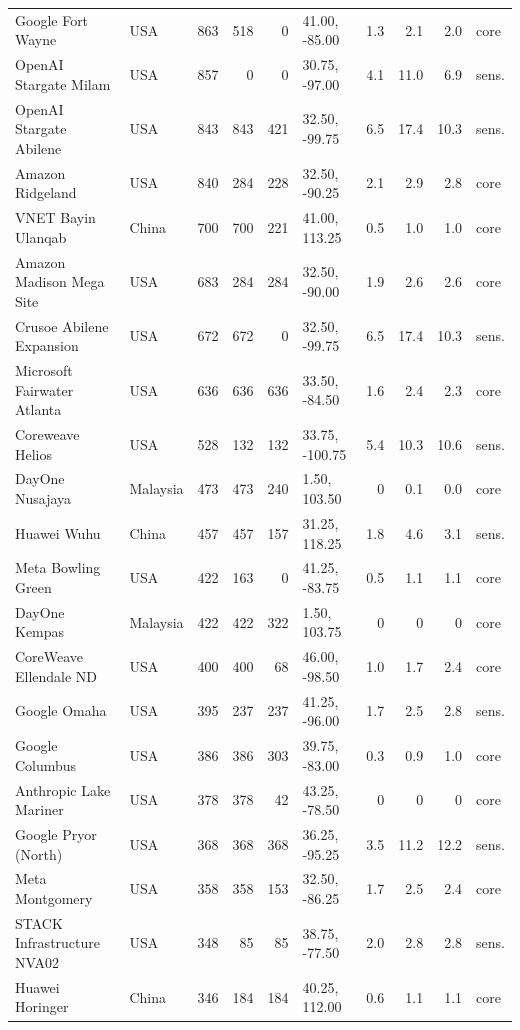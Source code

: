 \begin{footnotesize}
\begin{longtable}{@{}p{46mm}lrrrlrrrl@{}}
Google Fort Wayne & USA & 863 & 518 & 0 & 41.00, -85.00 & 1.3 & 2.1 & 2.0 & core \\
OpenAI Stargate Milam & USA & 857 & 0 & 0 & 30.75, -97.00 & 4.1 & 11.0 & 6.9 & sens. \\
OpenAI Stargate Abilene & USA & 843 & 843 & 421 & 32.50, -99.75 & 6.5 & 17.4 & 10.3 & sens. \\
Amazon Ridgeland & USA & 840 & 284 & 228 & 32.50, -90.25 & 2.1 & 2.9 & 2.8 & core \\
VNET Bayin Ulanqab & China & 700 & 700 & 221 & 41.00, 113.25 & 0.5 & 1.0 & 1.0 & core \\
Amazon Madison Mega Site & USA & 683 & 284 & 284 & 32.50, -90.00 & 1.9 & 2.6 & 2.6 & core \\
Crusoe Abilene Expansion & USA & 672 & 672 & 0 & 32.50, -99.75 & 6.5 & 17.4 & 10.3 & sens. \\
Microsoft Fairwater Atlanta & USA & 636 & 636 & 636 & 33.50, -84.50 & 1.6 & 2.4 & 2.3 & core \\
Coreweave Helios & USA & 528 & 132 & 132 & 33.75, -100.75 & 5.4 & 10.3 & 10.6 & sens. \\
DayOne Nusajaya & Malaysia & 473 & 473 & 240 & 1.50, 103.50 & 0 & 0.1 & 0.0 & core \\
Huawei Wuhu & China & 457 & 457 & 157 & 31.25, 118.25 & 1.8 & 4.6 & 3.1 & sens. \\
Meta Bowling Green & USA & 422 & 163 & 0 & 41.25, -83.75 & 0.5 & 1.1 & 1.1 & core \\
DayOne Kempas & Malaysia & 422 & 422 & 322 & 1.50, 103.75 & 0 & 0 & 0 & core \\
CoreWeave Ellendale ND & USA & 400 & 400 & 68 & 46.00, -98.50 & 1.0 & 1.7 & 2.4 & core \\
Google Omaha & USA & 395 & 237 & 237 & 41.25, -96.00 & 1.7 & 2.5 & 2.8 & sens. \\
Google Columbus & USA & 386 & 386 & 303 & 39.75, -83.00 & 0.3 & 0.9 & 1.0 & core \\
Anthropic Lake Mariner & USA & 378 & 378 & 42 & 43.25, -78.50 & 0 & 0 & 0 & core \\
Google Pryor (North) & USA & 368 & 368 & 368 & 36.25, -95.25 & 3.5 & 11.2 & 12.2 & sens. \\
Meta Montgomery & USA & 358 & 358 & 153 & 32.50, -86.25 & 1.7 & 2.5 & 2.4 & core \\
STACK Infrastructure NVA02 & USA & 348 & 85 & 85 & 38.75, -77.50 & 2.0 & 2.8 & 2.8 & sens. \\
Huawei Horinger & China & 346 & 184 & 184 & 40.25, 112.00 & 0.6 & 1.1 & 1.1 & core \\

\end{longtable}
\end{footnotesize}
